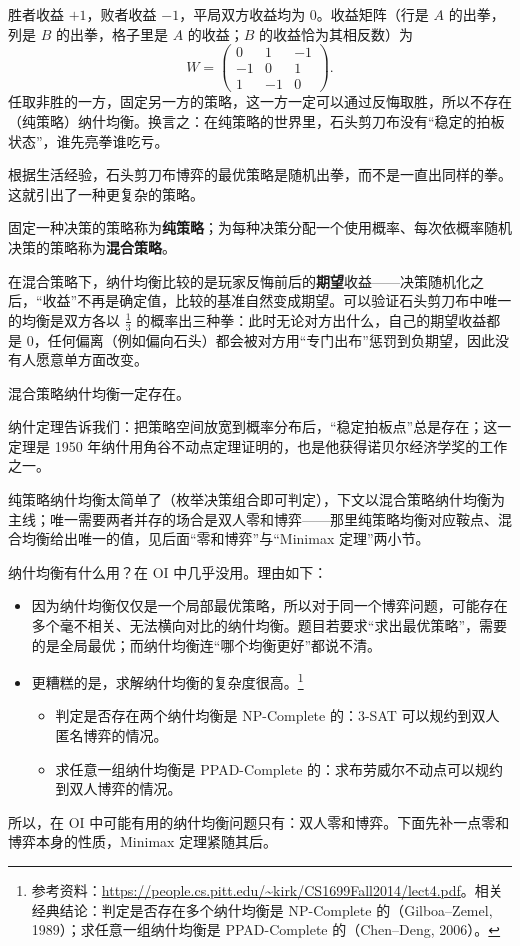 \begin{example}[石头剪刀布没有纯策略均衡]
胜者收益 $+1$，败者收益 $-1$，平局双方收益均为 $0$。收益矩阵（行是 $A$ 的出拳，列是 $B$ 的出拳，格子里是 $A$ 的收益；$B$ 的收益恰为其相反数）为
\[
 W=\begin{pmatrix}0&1&-1\\-1&0&1\\1&-1&0\end{pmatrix}.
\]
任取非胜的一方，固定另一方的策略，这一方一定可以通过反悔取胜，所以不存在（纯策略）纳什均衡。换言之：在纯策略的世界里，石头剪刀布没有“稳定的拍板状态”，谁先亮拳谁吃亏。
\end{example}

根据生活经验，石头剪刀布博弈的最优策略是随机出拳，而不是一直出同样的拳。这就引出了一种更复杂的策略。

\begin{definition}[纯策略与混合策略]
固定一种决策的策略称为\textbf{纯策略}；为每种决策分配一个使用概率、每次依概率随机决策的策略称为\textbf{混合策略}。
\end{definition}

在混合策略下，纳什均衡比较的是玩家反悔前后的\textbf{期望}收益——决策随机化之后，“收益”不再是确定值，比较的基准自然变成期望。可以验证石头剪刀布中唯一的均衡是双方各以 $\tfrac13$ 的概率出三种拳：此时无论对方出什么，自己的期望收益都是 $0$，任何偏离（例如偏向石头）都会被对方用“专门出布”惩罚到负期望，因此没有人愿意单方面改变。

\begin{theorem}[纳什定理]\label{thm:nash}
混合策略纳什均衡一定存在。
\end{theorem}

纳什定理告诉我们：把策略空间放宽到概率分布后，“稳定拍板点”总是存在；这一定理是 1950 年纳什用角谷不动点定理证明的，也是他获得诺贝尔经济学奖的工作之一。

纯策略纳什均衡太简单了（枚举决策组合即可判定），下文以混合策略纳什均衡为主线；唯一需要两者并存的场合是双人零和博弈——那里纯策略均衡对应鞍点、混合均衡给出唯一的值，见后面“零和博弈”与“Minimax 定理”两小节。

纳什均衡有什么用？在 OI 中几乎没用。理由如下：
\begin{itemize}
\item 因为纳什均衡仅仅是一个局部最优策略，所以对于同一个博弈问题，可能存在多个毫不相关、无法横向对比的纳什均衡。题目若要求“求出最优策略”，需要的是全局最优；而纳什均衡连“哪个均衡更好”都说不清。
\item 更糟糕的是，求解纳什均衡的复杂度很高。\footnote{参考资料：\url{https://people.cs.pitt.edu/~kirk/CS1699Fall2014/lect4.pdf}。相关经典结论：判定是否存在多个纳什均衡是 NP-Complete 的（Gilboa--Zemel, 1989）；求任意一组纳什均衡是 PPAD-Complete 的（Chen--Deng, 2006）。}
\begin{itemize}
\item 判定是否存在两个纳什均衡是 NP-Complete 的：3-SAT 可以规约到双人匿名博弈的情况。
\item 求任意一组纳什均衡是 PPAD-Complete 的：求布劳威尔不动点可以规约到双人博弈的情况。
\end{itemize}
\end{itemize}
所以，在 OI 中可能有用的纳什均衡问题只有：双人零和博弈。下面先补一点零和博弈本身的性质，Minimax 定理紧随其后。


